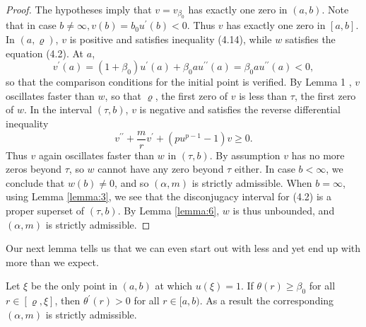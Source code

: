 \begin{proof}
  The hypotheses imply that $v=v_{\beta_0}$ has exactly one zero in $(a, b)$.
  Note that in case $b \neq \infty, v(b)=b_0 u^{\prime}(b)<0$.
  Thus $v$ has exactly one zero in $[a, b]$. In $(a, \varrho)$,
  $v$ is positive and satisfies inequality (4.14), while $w$ satisfies the equation (4.2).
  At $a$,
  \[
    v^{\prime}(a) = \left(1+\beta_0\right) u^{\prime}(a)+\beta_0 a u^{\prime \prime}(a)
      = \beta_0 a u^{\prime \prime}(a) < 0,
  \]
  so that the comparison conditions for the initial point is verified.
  By Lemma 1 , $v$ oscillates faster than $w$, so that $\varrho$, the first zero of $v$
  is less than $\tau$, the first zero of $w$. In the interval $(\tau, b)$,
  $v$ is negative and satisfies the reverse differential inequality
  \begin{equation}\label{eq:4.15}
    v^{\prime \prime}+\frac{m}{r} v^{\prime}+\left(p u^{p-1}-1\right) v \geq 0.
  \end{equation}
  Thus $v$ again oscillates faster than $w$ in $(\tau, b)$. By assumption $v$
  has no more zeros beyond $\tau$, so $w$ cannot have any zero beyond $\tau$ either.
  In case $b<\infty$, we conclude that $w(b) \neq 0$, and so $(\alpha, m)$
  is strictly admissible. When $b=\infty$, using Lemma \ref{lemma:3},
  we see that the disconjugacy interval for (4.2) is a proper superset of $(\tau, b)$.
  By Lemma \ref{lemma:6}, $w$ is thus unbounded, and $(\alpha, m)$ is strictly admissible.
\end{proof}

Our next lemma tells us that we can even start out with less and yet end up
with more than we expect.

\begin{lemma}\label{lemma:25}
  Let $\xi$ be the only point in $(a, b)$ at which $u(\xi)=1$. If $\theta(r) \geq \beta_0$
  for all $r \in[\varrho, \xi]$, then $\theta^{\prime}(r)>0$ for all $r \in[a, b)$.
  As a result the corresponding $(\alpha, m)$ is strictly admissible.
\end{lemma}

